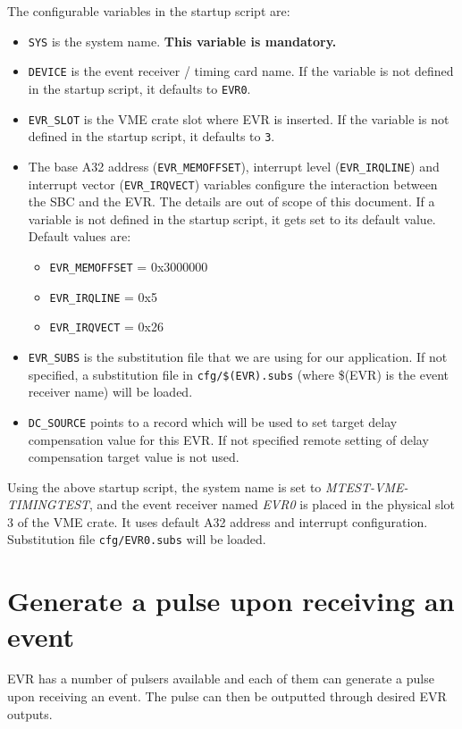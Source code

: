 \documentclass[12pt,a4paper]{article}
\begin{document}
\begin{enumerate}
The configurable variables in the startup script are:
\begin{itemize}
	\item
		\texttt{SYS} is the system name. \textbf{This variable is mandatory.}
	\item 
		\texttt{DEVICE} is the event receiver / timing card name. If the variable is not defined in the startup script, it defaults to \texttt{EVR0}.
	\item 
		\texttt{EVR\_SLOT} is the VME crate slot where EVR is inserted. If the variable is not defined in the startup script, it defaults to \texttt{3}.
	\item 
		The base A32 address (\texttt{EVR\_MEMOFFSET}), interrupt level (\texttt{EVR\_IRQLINE}) and interrupt vector (\texttt{EVR\_IRQVECT}) variables configure the interaction between the SBC and the EVR. The details are out of scope of this document. If a variable is not defined in the startup script, it gets set to its default value. Default values are:
		\begin{itemize}
		\item \texttt{EVR\_MEMOFFSET} = 0x3000000
		\item \texttt{EVR\_IRQLINE} = 0x5
		\item \texttt{EVR\_IRQVECT} = 0x26
		\end{itemize}
	\item 
		\texttt{EVR\_SUBS} is the substitution file that we are using for our application. If not specified, a substitution file in \texttt{cfg/\$(EVR).subs} (where \$(EVR) is the event receiver name) will be loaded.
	\item \texttt{DC\_SOURCE} points to a record which will be used to set target delay compensation value for this EVR. If not specified remote setting of delay compensation target value is not used.
\end{itemize}
Using the above startup script, the system name is set to \textit{MTEST-VME-TIMINGTEST}, and the event receiver named \textit{EVR0} is placed in the physical slot 3 of the VME crate. It uses default A32 address and interrupt configuration. Substitution file \texttt{cfg/EVR0.subs} will be loaded.
\end{enumerate}


\section{Generate a pulse upon receiving an event}
EVR has a number of pulsers available and each of them can generate a pulse upon receiving an event. The pulse can then be outputted through desired EVR outputs. 
\end{document}
